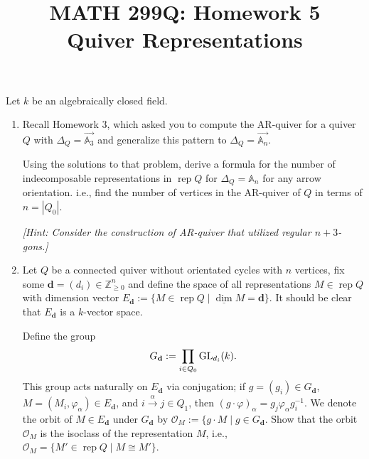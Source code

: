\documentclass{article}
\title{MATH 299Q: Homework 5\\{\Large Quiver Representations}}
\author{}
\date{}
\theoremstyle{plain}
\theoremstyle{definition}
\theoremstyle{remark}
\numberwithin{equation}{section}
\def\Z{{\mathbb Z}}
\def\k{k}
\def\O{\mathcal{O}}
\DeclareMathOperator{\rep}{rep}
\begin{document}
\maketitle

Let $\k$ be an algebraically closed field.

\begin{enumerate}[1.]
    \item Recall Homework 3, which asked you to compute the AR-quiver for a quiver $Q$ with $\Delta_Q=\overrightarrow{\mathbb{A}_3}$ and generalize this pattern to $\Delta_Q=\overrightarrow{\mathbb{A}_n}$.
    
    \qquad Using the solutions to that problem, derive a formula for the number of indecomposable representations in $\rep Q$ for $\Delta_Q=\mathbb{A}_n$ for any arrow orientation. i.e., find the number of vertices in the AR-quiver of $Q$ in terms of $n=|Q_0|$.

    \emph{[Hint: Consider the construction of AR-quiver that utilized regular $n+3$-gons.]}
    
    \vfill
    \item Let $Q$ be a connected quiver without orientated cycles with $n$ vertices, fix some $\mathbf{d}=(d_i)\in\Z_{\geq 0}^n$ and define the space of all representations $M\in\rep Q$ with dimension vector $E_{\mathbf{d}} := \{M\in\rep Q\mid\underline{\dim}M=\mathbf{d}\}$. It should be clear that $E_{\mathbf{d}}$ is a $\k$-vector space.
    
    \qquad Define the group
    \[G_{\mathbf{d}} := \prod_{i\in Q_0}\textup{GL}_{d_i}(\k).\]
    This group acts naturally on $E_{\mathbf{d}}$ via conjugation; if $g=(g_i)\in G_{\mathbf{d}}$, $M=(M_i,\varphi_\alpha)\in E_{\mathbf{d}}$, and $i\xrightarrow{\alpha}j\in Q_1$, then $(g\cdot \varphi)_\alpha = g_j\varphi_\alpha g_i^{-1}$. We denote the orbit of $M\in E_{\mathbf{d}}$ under $G_{\mathbf{d}}$ by $\O_M := \{g\cdot M\mid g\in G_{\mathbf{d}}$. Show that the orbit $\O_M$ is the isoclass of the representation $M$, i.e., $\O_M = \{M'\in\rep Q\mid M\cong M'\}$.
    \vfill
\end{enumerate}
\end{document}

